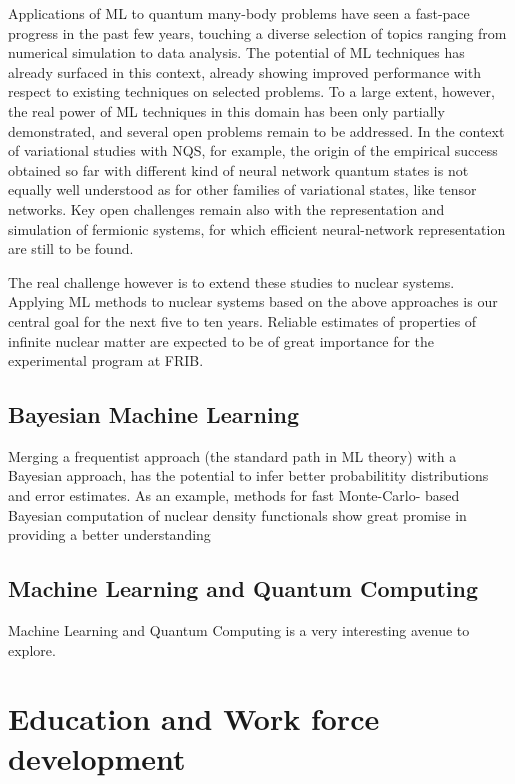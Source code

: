 \documentclass[%
oneside,                 %
final,                   %
10pt]{article}
\begin{document}
Applications of ML to quantum many-body problems have seen a fast-pace
progress in the past few years, touching a diverse selection of topics
ranging from numerical simulation to data analysis. The potential of
ML techniques has already surfaced in this context, already showing
improved performance with respect to existing techniques on selected
problems. To a large extent, however, the real power of ML techniques
in this domain has been only partially demonstrated, and several open
problems remain to be addressed.
In the context of variational studies with NQS, for example, the
origin of the empirical success obtained so far with different kind of
neural network quantum states is not equally well understood as for
other families of variational states, like tensor networks. Key open
challenges remain also with the representation and simulation of
fermionic systems, for which efficient neural-network representation
are still to be found.



The real challenge however is to extend these studies to nuclear
systems. Applying ML methods to nuclear systems based on the above
approaches is our central goal for the next five to ten years.  Reliable estimates of properties of infinite nuclear matter are expected to be of great importance for the experimental program at FRIB.



\subsection{Bayesian Machine Learning}

Merging a frequentist approach (the standard path in ML theory) with a Bayesian approach, has the potential to infer better probabilitity distributions and error estimates. As an example, methods for fast Monte-Carlo- based Bayesian computation of nuclear density functionals show great promise in providing a better understanding 

\subsection{Machine Learning and Quantum Computing}
Machine Learning and Quantum Computing is a very interesting avenue to explore.



\section{Education and Work force development}
\end{document}
